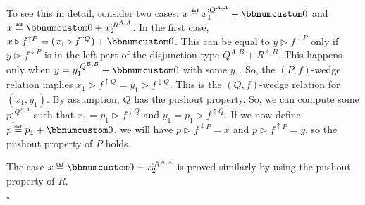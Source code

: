 To see this in detail, consider two cases: $x\triangleq x_{1}^{:Q^{A,A}}+\bbnum 0$
and $x\triangleq\bbnum 0+x_{2}^{:R^{A,A}}$. In the first case, $x\triangleright f^{\uparrow P}=(x_{1}\triangleright f^{\uparrow Q})+\bbnum 0$.
This can be equal to $y\triangleright f^{\downarrow P}$ only if $y\triangleright f^{\downarrow P}$
is in the left part of the disjunction type $Q^{A,B}+R^{A,B}$. This
happens only when $y=y_{1}^{:Q^{B,B}}+\bbnum 0$ with some $y_{1}$.
So, the $\left(P,f\right)$-wedge relation implies $x_{1}\triangleright f^{\uparrow Q}=y_{1}\triangleright f^{\downarrow Q}$.
This is the $\left(Q,f\right)$-wedge relation for $(x_{1},y_{1})$.
By assumption, $Q$ has the pushout property. So, we can compute some
$p_{1}^{:Q^{B,A}}$ such that $x_{1}=p_{1}\triangleright f^{\downarrow Q}$
and $y_{1}=p_{1}\triangleright f^{\uparrow Q}$. If we now define
$p\triangleq p_{1}+\bbnum 0$, we will have $p\triangleright f^{\downarrow P}=x$
and $p\triangleright f^{\uparrow P}=y$, so the pushout property of
$P$ holds.

The case $x\triangleq\bbnum 0+x_{2}^{:R^{A,A}}$ is proved similarly
by using the pushout property of $R$. %
\begin{comment}
\textbf{(f)} Rewrite the wedge relation for $x^{:S^{A,A,P^{A,A}}}$
and $y^{:S^{B,B,P^{B,B}}}$ by using the explicit liftings to $S$:
\[
x\triangleright f^{\uparrow S^{A,\bullet,P^{A,A}}}\bef\big(\overline{f^{\uparrow P^{A,\bullet}}}\big)^{\uparrow S^{A,B,\bullet}}=y\triangleright f^{\downarrow S^{\bullet,B,P^{B,B}}}\bef\big(\overline{f^{\downarrow P^{\bullet,B}}}\big)^{\uparrow S^{A,B,\bullet}}\quad.
\]
Due to the commutativity law of $S$, we may exchange the order of
compositions here:
\[
f^{\uparrow S^{A,\bullet,P^{A,B}}}\big(x\triangleright(f^{\uparrow P^{A,\bullet}})^{\uparrow S^{A,A,\bullet}}\big)=y\triangleright\big(\overline{f^{\downarrow P^{\bullet,B}}}\big)^{\uparrow S^{B,B,\bullet}}\triangleright f^{\downarrow S^{\bullet,B,P^{A,B}}}\quad.
\]
Now we can use the pushout property of $S$ to obtain some $z:S^{B,A,P^{A,B}}$
such that:
\[
x\triangleright\big(\overline{f^{\uparrow P^{A,\bullet}}}\big)^{\uparrow S^{A,A,\bullet}}=z\triangleright f^{\downarrow S^{\bullet,A,P^{A,B}}}\text{ and }y\triangleright\big(\overline{f^{\downarrow P^{\bullet,B}}}\big)^{\uparrow S^{B,B,\bullet}}=z\triangleright f^{\uparrow S^{B,\bullet,P^{A,B}}}\quad.
\]
We need to produce a value $t:S^{B,A,P^{B,A}}$ such that: 
\[
x=t\triangleright f^{\downarrow S^{\bullet,A,P^{B,A}}}\bef\big(\overline{f^{\downarrow P^{\bullet,A}}}\big)^{\uparrow S^{A,A,\bullet}}\text{ and }y=t\triangleright f^{\uparrow S^{B,\bullet,P^{B,A}}}\bef\big(\overline{f^{\uparrow P^{B,\bullet}}}\big)^{\uparrow S^{B,B,\bullet}}\quad.
\]
\end{comment}
$\square$

